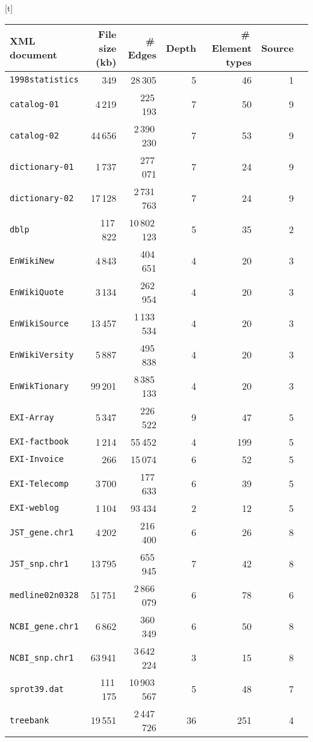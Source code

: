 \documentclass[12pt]{llncs}
\makeatletter
\renewenvironment{table}
               {\setlength\abovecaptionskip{10\p@}\setlength\belowcaptionskip{10\p@}\@float{table}}
               {\end@float}
\makeatother
\begin{document}
\begin{table}[t]
\centering
		\begin{tabular}{lrrrrrr}\toprule
		XML document						&File size (kb)&\#\,Edges	&Depth	&\#\,Element types	&Source\\
		\midrule
		\texttt{1998statistics}			&349			&28\,305		&5		&46				&1\\
		\texttt{catalog-01}				&4\,219		&225\,193		&7		&50				&9\\
		\texttt{catalog-02}				&44\,656		&2\,390\,230	&7		&53				&9\\
		\texttt{dictionary-01}				&1\,737		&277\,071		&7		&24				&9\\
		\texttt{dictionary-02}				&17\,128		&2\,731\,763	&7		&24				&9\\
		\texttt{dblp}						&117\,822		&10\,802\,123	&5		&35				&2\\
		\texttt{EnWikiNew}				&4\,843		&404\,651		&4		&20				&3\\
		\texttt{EnWikiQuote}				&3\,134		&262\,954		&4		&20				&3\\
		\texttt{EnWikiSource}			&13\,457		&1\,133\,534	&4		&20				&3\\
		\texttt{EnWikiVersity}			&5\,887		&495\,838		&4		&20				&3\\
		\texttt{EnWikTionary}			&99\,201		&8\,385\,133	&4		&20				&3\\
		\texttt{EXI-Array}				&5\,347		&226\,522		&9		&47				&5\\
		\texttt{EXI-factbook}			&1\,214		&55\,452		&4		&199				&5\\
		\texttt{EXI-Invoice}				&266			&15\,074		&6		&52				&5\\
		\texttt{EXI-Telecomp}			&3\,700		&177\,633		&6		&39				&5\\
		\texttt{EXI-weblog}				&1\,104		&93\,434		&2		&12				&5\\
		\texttt{JST\_gene.chr1}			&4\,202		&216\,400		&6		&26				&8\\
		\texttt{JST\_snp.chr1}				&13\,795		&655\,945		&7		&42				&8\\
		\texttt{medline02n0328}			&51\,751		&2\,866\,079	&6		&78				&6\\
		\texttt{NCBI\_gene.chr1}			&6\,862		&360\,349		&6		&50				&8\\
		\texttt{NCBI\_snp.chr1}			&63\,941		&3\,642\,224	&3		&15				&8\\
		\texttt{sprot39.dat}				&111\,175		&10\,903\,567	&5		&48				&7\\
		\texttt{treebank}				&19\,551		&2\,447\,726	&36		&251				&4\\
		\bottomrule
		\end{tabular}
	\caption{Characteristics of the XML documents used in our tests. The values in the "Source"-column match the source IDs in Table \ref{tbl:sourcesOfXmlDocuments}. The depth of an XML document tree specifies the length (number of edges) of the longest path from the root of the tree to a leaf.}
	\label{tbl:characteristicsXmlDocuments}
\end{table}
\end{document}
